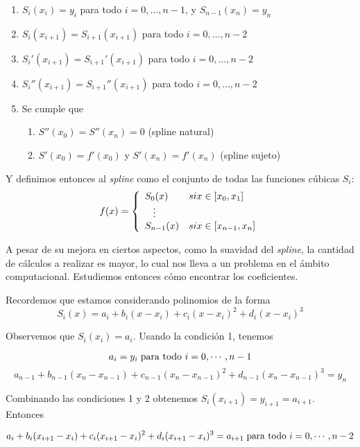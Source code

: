 \begin{enumerate}
\item $S_i(x_i) = y_i$ para todo $i = 0, \ldots, n-1$, y $S_{n-1}(x_n)=y_n$
\item $S_i(x_{i + 1}) = S_{i + 1}(x_{i + 1})$ para todo $i = 0, \ldots, n - 2$
\item $S_i'(x_{i + 1}) = S_{i + 1}'(x_{i + 1})$ para todo $i = 0, \ldots, n - 2$
\item $S_i''(x_{i + 1}) = S_{i + 1}''(x_{i + 1})$ para todo $i = 0, \ldots, n - 2$
\item Se cumple que
\begin{enumerate}
\item $S''(x_0) = S''(x_n) = 0$ (spline natural)
\item $S'(x_0) = f'(x_0)$ y $S'(x_n) = f'(x_n)$ (spline sujeto)
\end{enumerate} 
\end{enumerate}

Y definimos entonces al \emph{spline} como el conjunto de todas las funciones cúbicas $S_i$:
$$
f(x) = 
\left\{
    \begin{array}{ll}
        S_0(x)  & \mbox{si } x \in [x_{0}, x_1] \\
        \hspace{0.3cm}\vdots \\     
        S_{n - 1}(x) & \mbox{si } x \in [x_{n - 1}, x_n]
    \end{array}
\right.
$$


A pesar de su mejora en ciertos aspectos, como la suavidad del \emph{spline}, la cantidad de c\'alculos a realizar es mayor, lo cual nos lleva a un problema en el \'ambito computacional. Estudiemos entonces cómo encontrar los coeficientes.

Recordemos que estamos considerando polinomios de la forma 
\[S_i(x) = a_i + b_i (x - x_i) + c_i (x - x_i)^2 + d_i (x - x_i)^3\]

Observemos que $S_i(x_i) = a_i$. Usando la condición 1, tenemos

\[a_i = y_i \hspace{0.1cm}\text{para todo } i = 0, \cdots, n - 1\]
\[a_{n - 1} + b_{n - 1} (x_n - x_{n - 1}) + c_{n - 1} (x_n - x_{n - 1})^2 + d_{n - 1} (x_n - x_{n - 1})^3 = y_n\]

Combinando las condiciones 1 y 2 obtenemos $S_i(x_{i + 1}) = y_{i + 1} = a_{i + 1}$. Entonces

\[a_i + b_i (x_{i + 1} - x_i) + c_i (x_{i + 1} - x_i)^2 + d_i (x_{i + 1} - x_i)^3 = a_{i + 1} \hspace{0.1cm}\text{para todo } i = 0, \cdots, n - 2\]

